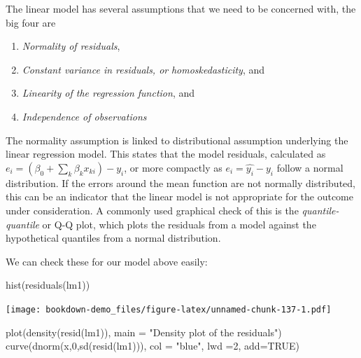 \documentclass[
]{article}
\newenvironment{Shaded}{\begin{snugshade}}{\end{snugshade}}
\newcommand{\AttributeTok}[1]{\textcolor[rgb]{0.77,0.63,0.00}{#1}}
\newcommand{\ConstantTok}[1]{\textcolor[rgb]{0.00,0.00,0.00}{#1}}
\newcommand{\DecValTok}[1]{\textcolor[rgb]{0.00,0.00,0.81}{#1}}
\newcommand{\FunctionTok}[1]{\textcolor[rgb]{0.00,0.00,0.00}{#1}}
\newcommand{\NormalTok}[1]{#1}
\newcommand{\StringTok}[1]{\textcolor[rgb]{0.31,0.60,0.02}{#1}}
\providecommand{\tightlist}{%
  \setlength{\itemsep}{0pt}\setlength{\parskip}{0pt}}
\begin{document}
The linear model has several assumptions that we need to be concerned with, the big four are

\begin{enumerate}
\def\labelenumi{\arabic{enumi})}
\tightlist
\item
  \emph{Normality of residuals},
\item
  \emph{Constant variance in residuals, or} \emph{\emph{homoskedasticity}}, and
\item
  \emph{Linearity of the regression function}, and
\item
  \emph{Independence of observations}
\end{enumerate}

The normality assumption is linked to distributional assumption underlying the linear regression model. This states that the model residuals, calculated as \(e_i = (\beta_0 +\sum_k \beta_k x_{ki}) - y_i\), or more compactly as \(e_i =\hat{y_i} - y_i\) follow a normal distribution. If the errors around the mean function are not normally distributed, this can be an indicator that the linear model is not appropriate for the outcome under consideration. A commonly used graphical check of this is the \emph{quantile-quantile} or Q-Q plot, which plots the residuals from a model against the hypothetical quantiles from a normal distribution.

We can check these for our model above easily:

\begin{Shaded}
\begin{Highlighting}[]
\FunctionTok{hist}\NormalTok{(}\FunctionTok{residuals}\NormalTok{(lm1))}
\end{Highlighting}
\end{Shaded}

\texttt{[image: bookdown-demo\_files/figure-latex/unnamed-chunk-137-1.pdf]}

\begin{Shaded}
\begin{Highlighting}[]
\FunctionTok{plot}\NormalTok{(}\FunctionTok{density}\NormalTok{(}\FunctionTok{resid}\NormalTok{(lm1)),}
     \AttributeTok{main =} \StringTok{"Density plot of the residuals"}\NormalTok{)}
\FunctionTok{curve}\NormalTok{(}\FunctionTok{dnorm}\NormalTok{(x,}\DecValTok{0}\NormalTok{,}\FunctionTok{sd}\NormalTok{(}\FunctionTok{resid}\NormalTok{(lm1))),}
       \AttributeTok{col =} \StringTok{"blue"}\NormalTok{, }\AttributeTok{lwd =}\DecValTok{2}\NormalTok{, }\AttributeTok{add=}\ConstantTok{TRUE}\NormalTok{)}
\end{Highlighting}
\end{Shaded}
\end{document}
